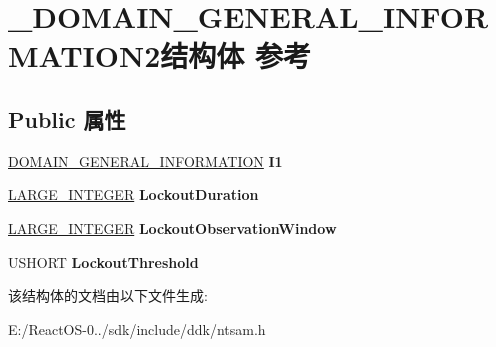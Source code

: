 \hypertarget{struct___d_o_m_a_i_n___g_e_n_e_r_a_l___i_n_f_o_r_m_a_t_i_o_n2}{}\section{\+\_\+\+D\+O\+M\+A\+I\+N\+\_\+\+G\+E\+N\+E\+R\+A\+L\+\_\+\+I\+N\+F\+O\+R\+M\+A\+T\+I\+O\+N2结构体 参考}
\label{struct___d_o_m_a_i_n___g_e_n_e_r_a_l___i_n_f_o_r_m_a_t_i_o_n2}
\subsection*{Public 属性}
\begin{DoxyCompactItemize}
\item 
\mbox{\label{struct___d_o_m_a_i_n___g_e_n_e_r_a_l___i_n_f_o_r_m_a_t_i_o_n2_aef9b7c129c8078a78341375198e563f9}} 
\hyperlink{struct___d_o_m_a_i_n___g_e_n_e_r_a_l___i_n_f_o_r_m_a_t_i_o_n}{D\+O\+M\+A\+I\+N\+\_\+\+G\+E\+N\+E\+R\+A\+L\+\_\+\+I\+N\+F\+O\+R\+M\+A\+T\+I\+ON} {\bfseries I1}
\item 
\mbox{\label{struct___d_o_m_a_i_n___g_e_n_e_r_a_l___i_n_f_o_r_m_a_t_i_o_n2_ae7861611d0d95c9e96ac98f1c71c92dd}} 
\hyperlink{union___l_a_r_g_e___i_n_t_e_g_e_r}{L\+A\+R\+G\+E\+\_\+\+I\+N\+T\+E\+G\+ER} {\bfseries Lockout\+Duration}
\item 
\mbox{\label{struct___d_o_m_a_i_n___g_e_n_e_r_a_l___i_n_f_o_r_m_a_t_i_o_n2_aa8d1528c2cb7918c82b1465661c2c884}} 
\hyperlink{union___l_a_r_g_e___i_n_t_e_g_e_r}{L\+A\+R\+G\+E\+\_\+\+I\+N\+T\+E\+G\+ER} {\bfseries Lockout\+Observation\+Window}
\item 
\mbox{\label{struct___d_o_m_a_i_n___g_e_n_e_r_a_l___i_n_f_o_r_m_a_t_i_o_n2_a45608109b746dc2e98ee1043e2588d9e}} 
U\+S\+H\+O\+RT {\bfseries Lockout\+Threshold}
\end{DoxyCompactItemize}


该结构体的文档由以下文件生成\+:\begin{DoxyCompactItemize}
\item 
E\+:/\+React\+O\+S-\/0../sdk/include/ddk/ntsam.\+h\end{DoxyCompactItemize}
